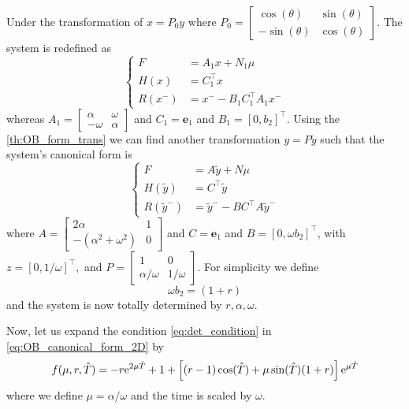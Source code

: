\documentclass{article}
\begin{document}
Under the transformation of $x = P_0 y$ where 
$
P_0 = \begin{bmatrix}
	   \cos(\theta)   &  \sin(\theta) \\
	   - \sin(\theta) &  \cos(\theta)  
     \end{bmatrix}
$.
The system is redefined as 
\begin{equation}
	\begin{cases}
		F  & = A_1 x + N_1 \mu
		\\
		H(x) & = C_1^{\top}x  
		\\
		R(x^-) & = x^- - B_1 C_1^{\top} A_1x^-
	\end{cases}
\end{equation}
whereas 
$
A_1 = \begin{bmatrix}
	\alpha & \omega
	\\
	-\omega & \alpha
\end{bmatrix}
$
and 
$
C_1 = \mathbf{e}_1
$
and 
$
B_1 = [0,b_2]^{\top}
$.
Using the \cref{th:OB_form_trans} we can find another transformation $y = P \tilde{y}$ such that the system's canonical form is 
\begin{equation}
	\begin{cases}
		F  & = A \tilde{y} + N \mu
		\\
		H(\tilde{y})  & = C^{\top} \tilde{y} 
		\\
		R(\tilde{y}^-) & = \tilde{y}^- - B C^{\top}A\tilde{y}^-
	\end{cases}
\label{eq:OB_canonical_form_2D}
\end{equation}
where 
$
A = \begin{bmatrix}
	2 \alpha & 1
	\\
	-(\alpha^2 + \omega^2) & 0
\end{bmatrix}
$
and 
$
C = \mathbf{e}_1
$
and 
$
B = [0, \omega b_2]^{\top}
$, 
with 
$
z = [0, 1/\omega]^{\top},
$
and
$
P = \begin{bmatrix}
	1 & 0 
	\\
	\alpha/\omega & 1/\omega
\end{bmatrix}
$. For simplicity we define 
\[
\omega b_2 = (1 + r) 
\] 
and the system is now totally determined by $r, \alpha, \omega$.




Now, let us expand the  condition \cref{eq:det_condition} in \cref{eq:OB_canonical_form_2D} by 
\[
f(\mu, r,\hat{T}) = -r {\rm e}^{2 \mu \hat{T} } + 1 + \left[ (r - 1) \cos(\hat{T}) + \mu \sin(\hat{T}) (1 + r)\right] {\rm e}^{\mu \hat{T}}
\]
where we define $\mu = \alpha/\omega$ and the time is scaled by $\omega$.
\end{document}
